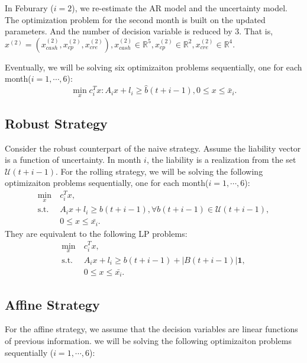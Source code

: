 \documentclass{article}
\begin{document}
    In Feburary ($i = 2$),  we re-estimate the AR model and the uncertainty model. The optimization problem for the second month is built on the updated parameters. And the number of decision variable is reduced by 3. That is, $x^{(2)}=(x^{(2)}_{cash}, x^{(2)}_{cp}, x^{(2)}_{cre}), x^{(2)}_{cash}\in\mathbb{R}^5, x^{(2)}_{cp}\in\mathbb{R}^2, x^{(2)}_{cre}\in\mathbb{R}^4$.

    Eventually, we will be solving six optimizaiton problems sequentially, one for each month($i = 1, \cdots, 6$):
    \begin{equation}
        \min_x c_i^Tx: A_ix+l_i\geq\hat{b}(t+i-1), 0\leq x\leq \bar{x}_i.
    \end{equation}


\subsection{Robust Strategy}

    Consider the robust counterpart of the naive strategy. Assume the liability vector is a function of uncertainty. In month $i$, the liability is a realization from the set $\mathcal{U}(t+i-1)$. For the rolling strategy, we will be solving the following optimizaiton problems sequentially, one for each month($i = 1, \cdots, 6$):
    \[\begin{split}
        \min_x\ & c_i^Tx,\\
        \text{s.t. }& A_ix+l_i\geq b(t+i-1), \forall b(t+i-1)\in\mathcal{U}(t+i-1) ,\\
        & 0\leq x\leq \bar{x_i}.
    \end{split}\]
    They are equivalent to the following LP problems:
    \[\begin{split}
        \min_x\ & c_i^Tx,\\
        \text{s.t. }& A_ix+l_i\geq b(t+i-1)+|B(t+i-1)|\textbf{1} ,\\
        & 0\leq x\leq \bar{x_i}.
    \end{split}\]


\subsection{Affine Strategy}

    For the affine strategy, we assume that the decision variables are linear functions of previous information. we will be solving the following optimizaiton problems sequentially ($i = 1, \cdots, 6$):
    
\end{document}
